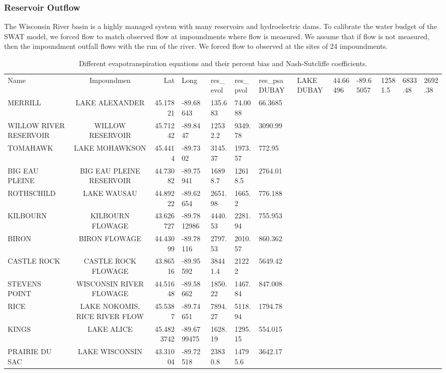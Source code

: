\subsubsection{Reservoir Outflow}
The Wisconsin River basin is a highly managed system with many reservoirs and hydroelectric dams. To calibrate the water budget of the SWAT model, we forced flow to match observed flow at impoundments where flow is measured. We assume that if flow is not measured, then the impoundment outfall flows with the run of the river. We forced flow to observed at the sites of 24 impoundments.
\begin{table}[h!]
	\caption[Different evapotranspiration equations ]{Different evapotranspiration equations and their percent bias and Nash-Sutcliffe coefficients.}
	\centering
	\begin{tabular}{ l c r }
		\hline
		Name & Impoundmen  & Lat            & Long & res_evol & res_pvol & res_psa
		\hline\hline
		DUBAY & LAKE DUBAY & 44.66496 & -89.65057 & 12581.5 & 6833.48 & 2692.38 \\
		MERRILL & LAKE ALEXANDER & 45.17821 & -89.68643 & 135.683 & 74.0088 & 66.3685 \\
		WILLOW RIVER RESERVOIR & WILLOW RESERVOIR & 45.71242 & -89.8447 & 12532.2 & 9349.78 & 3090.99 \\
		TOMAHAWK & LAKE MOHAWKSON & 45.4414 & -89.7302 & 3145.37 & 1973.57 & 772.95 \\
		BIG EAU PLEINE & BIG EAU PLEINE RESERVOIR & 44.73082 & -89.75941 & 16898.7 & 12618.5 & 2764.01 \\
		ROTHSCHILD & LAKE WAUSAU & 44.89222 & -89.62654 & 2651.98 & 1665.2 & 776.188 \\
		KILBOURN & KILBOURN FLOWAGE & 43.626727 & -89.7812986 & 4440.53 & 2281.94 & 755.953 \\
		BIRON & BIRON FLOWAGE & 44.43099 & -89.78116 & 2797.53 & 2010.57 & 860.362 \\
		CASTLE ROCK & CASTLE ROCK FLOWAGE & 43.86516 & -89.95592 & 38441.4 & 21222 & 5649.42 \\
		STEVENS POINT & WISCONSIN RIVER FLOWAGE & 44.51648 & -89.58662 & 1850.22 & 1467.84 & 847.008 \\
		RICE & LAKE NOKOMIS, RICE RIVER FLOW & 45.5387 & -89.74651 & 7894.27 & 5118.94 & 1794.78 \\
		KINGS & LAKE ALICE & 45.4823742 & -89.6799475 & 1628.19 & 1295.15 & 554.015 \\
		PRAIRIE DU SAC & LAKE WISCONSIN & 43.31004 & -89.72518 & 23830.8 & 14795.6 & 3642.17 \\

\end{tabular}
\end{table}
